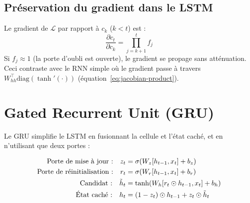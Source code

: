 \subsection{Pr\'eservation du gradient dans le LSTM}

\begin{proposition}
Le gradient de $\mathcal{L}$ par rapport \`a $c_k$ ($k < t$) est :
\begin{equation}
\frac{\partial c_t}{\partial c_k}
= \prod_{j=k+1}^{t} f_j
\label{eq:lstm-gradient}
\end{equation}
Si $f_j \approx 1$ (la porte d'oubli est ouverte), le gradient se propage
sans att\'enuation. Ceci contraste avec le RNN simple o\`u le gradient
passe \`a travers $W_{hh}^\top \text{diag}(\tanh'(\cdot))$
(\'equation~\ref{eq:jacobian-product}).
\end{proposition}

\section{Gated Recurrent Unit (GRU)}
\label{sec:gru}

Le GRU \cite{cho2014learning} simplifie le LSTM en fusionnant la cellule et
l'\'etat cach\'e, et en n'utilisant que deux portes :

\begin{formules}[title=\textbf{\'Equations du GRU}]
\begin{align}
\text{Porte de mise \`a jour :} \quad
z_t &= \sigma(W_z [h_{t-1}, x_t] + b_z)
\label{eq:gru-update} \\
\text{Porte de r\'einitialisation :} \quad
r_t &= \sigma(W_r [h_{t-1}, x_t] + b_r)
\label{eq:gru-reset} \\
\text{Candidat :} \quad
\tilde{h}_t &= \tanh(W_h [r_t \odot h_{t-1}, x_t] + b_h)
\label{eq:gru-candidate} \\
\text{\'Etat cach\'e :} \quad
h_t &= (1 - z_t) \odot h_{t-1} + z_t \odot \tilde{h}_t
\label{eq:gru-hidden}
\end{align}
\end{formules}

